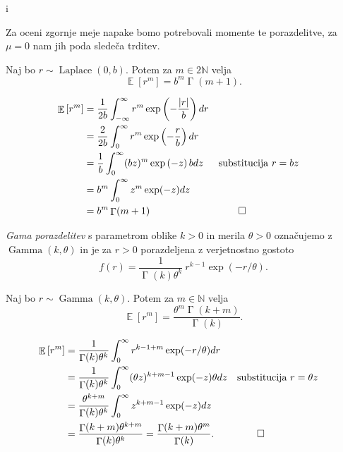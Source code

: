 i\documentclass[mat1]{fmfdelo}
\newcommand{\N}{\mathbb N}
\DeclareMathOperator*{\E}{\mathbb E}
\DeclareMathOperator{\gfn}{\Gamma}
\begin{document}
Za oceni zgornje meje napake bomo potrebovali momente te porazdelitve, za $\mu = 0$ nam jih poda sledeča trditev.
\begin{trditev} \label{laplacemoment}
    Naj bo $r \sim \operatorname{Laplace}(0, b)$. Potem za $m \in 2\N$ velja
    \begin{equation*}
        \E \left[r^m\right] = b^m \gfn(m+1).
    \end{equation*}
\end{trditev}
\begin{dokaz}
    \begin{align*}
    \E \left[r^m\right] &= \frac{1}{2b} \int_{-\infty}^{\infty}  r^m \exp \left(-{\frac{|r|}{b}}\right) dr \\
    &= \frac{2}{2b} \int_{0}^{\infty}  r^m \exp \left(-{\frac{r}{b}}\right) dr \\
    &= \frac{1}{b} \int_{0}^{\infty}  (bz)^m \exp \left(-z\right) b dz && \textrm{substitucija } r=bz \\
    &= b^m \int_{0}^{\infty} z^m \exp(-z) dz \\
    &= b^m \gfn(m+1) && \qedhere
    \end{align*}
\end{dokaz}

\begin{definicija}
{\em Gama porazdelitev} s parametrom oblike $k > 0$ in merila $\theta >0$ označujemo z $\operatorname{Gamma}(k, \theta)$ in je za $r > 0$ porazdeljena z verjetnostno gostoto
\begin{equation*}
    f(r) = \frac{1}{\gfn(k)\theta^k}\ r^{k-1} \exp(-r/\theta).
\end{equation*}
\end{definicija}

\begin{trditev} \label{gammamoment}
    Naj bo $r \sim \operatorname{Gamma}(k, \theta)$. Potem za $m \in \N$ velja
    \begin{equation*}
        \E \left[r^m\right] = \frac{\theta^m \gfn(k+m)}{\gfn(k)}.
    \end{equation*}
\end{trditev}
\begin{dokaz}
    \begin{align*}
    \E \left[r^m\right] &= \frac{1}{\gfn(k)\theta^k} \int_{0}^{\infty} r^{k-1+m} \exp(-r/\theta) dr \\
    &= \frac{1}{\gfn(k)\theta^k} \int_{0}^{\infty} (\theta z)^{k+m-1} \exp(-z) \theta dz && \text{substitucija } r = \theta z \\
    &= \frac{\theta^{k+m}}{\gfn(k)\theta^k} \int_{0}^{\infty} z^{k+m-1} \exp(-z) dz \\
    &= \frac{\gfn(k+m)\theta^{k+m}}{\gfn(k)\theta^k} = \frac{\gfn(k+m)\theta^{m}}{\gfn(k)}. && \qedhere
    \end{align*}
\end{dokaz}
\end{document}
